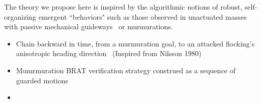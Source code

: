 The theory we propose here is inspired by the algorithmic notions of robust, self-organizing emergent ``behaviors" such as those observed in   unactuated masses with passive mechanical guideways~\cite{SeqCompKoditschek} or murmurations. %

\begin{itemize}
	\item Chain backward in time, from a murmuration goal, to an attacked flocking's anisotropic heading direction~\cite{Lozano84} (Inspired from Nilsson 1980)
	\item Mumrmuration BRAT verification strategy construed as a sequence of guarded motions~\cite{Grossman1975}
	\item 
\end{itemize}

